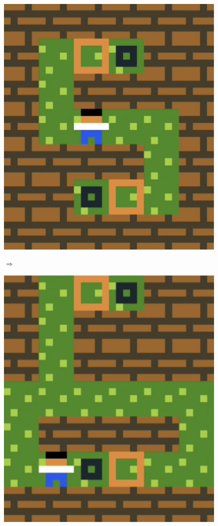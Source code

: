 \begin{description}
\begin{figure}[!htbp]
\begin{minipage}[t]{0.25\textwidth}
\includegraphics[width=\textwidth]{figures/windowdressingpart72.png} \hfill \\
\end{minipage}
$\Longrightarrow$
\begin{minipage}[t]{0.25\textwidth}
\includegraphics[width=\textwidth]{figures/windowdressingpart73.png} \hfill \\

\end{minipage}
\end{figure}
\end{description}

